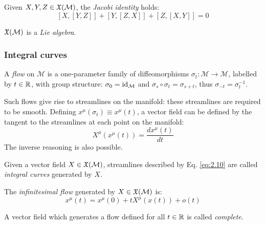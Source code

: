 \begin{theorem}[Jacobi]
  Given $ X,Y,Z \in\mathfrak{X}(\mathcal{M}) $, the \textit{Jacobi identity} holds:
  \begin{equation}
    \left[ X, \left[ Y,Z \right] \right] + \left[ Y, \left[ Z,X \right] \right] + \left[ Z, \left[ X,Y \right] \right] = 0
    \label{eq:2.9}
  \end{equation}
\end{theorem}

\begin{proposition}
  $ \mathfrak{X}(\mathcal{M}) $ is a \textit{Lie algebra}.
\end{proposition}

\subsubsection{Integral curves}

\begin{definition}\label{def-flow}
  A \textit{flow} on $ \mathcal{M} $ is a one-parameter family of diffeomorphisms $ \sigma_t : \mathcal{M} \rightarrow \mathcal{M} $, labelled by $ t\in\mathbb{R} $, with group structure: $ \sigma_0 = \operatorname{id}_{\mathcal{M}} $ and $ \sigma_s \circ \sigma_t = \sigma_{s+t} $, thus $ \sigma_{-t} = \sigma_t^{-1} $.
\end{definition}

Such flows give rise to streamlines on the manifold: these streamlines are required to be smooth.
Defining $ x^{\mu}(\sigma_t) \equiv x^{\mu}(t) $, a vector field can be defined by the tangent to the streamlines at each point on the manifold:
\begin{equation}
  X^{\mu}(x^{\mu}(t)) = \frac{dx^{\mu}(t)}{dt}
  \label{eq:2.10}
\end{equation}
The inverse reasoning is also possible.

\begin{definition}
  Given a vector field $ X \in\mathfrak{X}(\mathcal{M}) $, streamlines described by Eq. \ref{eq:2.10} are called \textit{integral curves} generated by $ X $.
\end{definition}

\begin{proposition}
  The \textit{infinitesimal flow} generated by $ X \in\mathfrak{X}(\mathcal{M}) $ is:
  \begin{equation}
    x^{\mu}(t) = x^{\mu}(0) + tX^{\mu}(x(t)) + o(t)
    \label{eq:2.11}
  \end{equation}
\end{proposition}

\begin{definition}
  A vector field which generates a flow defined for all $ t \in \mathbb{R} $ is called \textit{complete}.
\end{definition}

